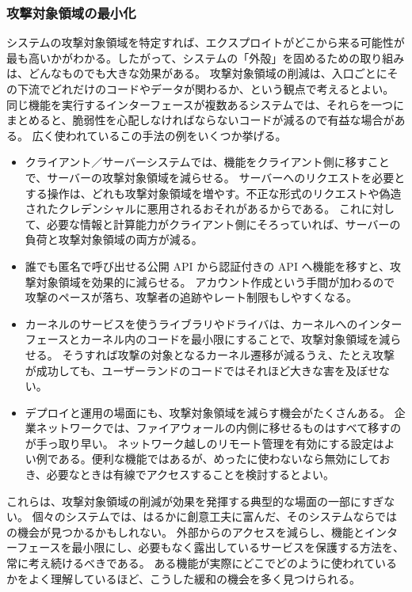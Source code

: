 \documentclass[uplatex]{jsarticle}
\def\label#1{}%
\begin{document}
\subsubsection{攻撃対象領域の最小化}\label{subsec:ch3-minimize-attack-surfaces}

システムの攻撃対象領域を特定すれば、エクスプロイトがどこから来る可能性が最も高いかがわかる。したがって、システムの「外殻」を固めるための取り組みは、どんなものでも大きな効果がある。
攻撃対象領域の削減は、入口ごとにその下流でどれだけのコードやデータが関わるか、という観点で考えるとよい。
同じ機能を実行するインターフェースが複数あるシステムでは、それらを一つにまとめると、脆弱性を心配しなければならないコードが減るので有益な場合がある。
広く使われているこの手法の例をいくつか挙げる。

\begin{exa}[攻撃対象領域の削減]\label{exa:ch3-attack-surface-reduction}
\begin{itemize}
\item クライアント／サーバーシステムでは、機能をクライアント側に移すことで、サーバーの攻撃対象領域を減らせる。
サーバーへのリクエストを必要とする操作は、どれも攻撃対象領域を増やす。不正な形式のリクエストや偽造されたクレデンシャルに悪用されるおそれがあるからである。
これに対して、必要な情報と計算能力がクライアント側にそろっていれば、サーバーの負荷と攻撃対象領域の両方が減る。
\item 誰でも匿名で呼び出せる公開 API から認証付きの API へ機能を移すと、攻撃対象領域を効果的に減らせる。
アカウント作成という手間が加わるので攻撃のペースが落ち、攻撃者の追跡やレート制限もしやすくなる。
\item カーネルのサービスを使うライブラリやドライバは、カーネルへのインターフェースとカーネル内のコードを最小限にすることで、攻撃対象領域を減らせる。
そうすれば攻撃の対象となるカーネル遷移が減るうえ、たとえ攻撃が成功しても、ユーザーランドのコードではそれほど大きな害を及ぼせない。
\item デプロイと運用の場面にも、攻撃対象領域を減らす機会がたくさんある。
企業ネットワークでは、ファイアウォールの内側に移せるものはすべて移すのが手っ取り早い。
ネットワーク越しのリモート管理を有効にする設定はよい例である。便利な機能ではあるが、めったに使わないなら無効にしておき、必要なときは有線でアクセスすることを検討するとよい。
\end{itemize}
\end{exa}

これらは、攻撃対象領域の削減が効果を発揮する典型的な場面の一部にすぎない。
個々のシステムでは、はるかに創意工夫に富んだ、そのシステムならではの機会が見つかるかもしれない。
外部からのアクセスを減らし、機能とインターフェースを最小限にし、必要もなく露出しているサービスを保護する方法を、常に考え続けるべきである。
ある機能が実際にどこでどのように使われているかをよく理解しているほど、こうした緩和の機会を多く見つけられる。
\end{document}
